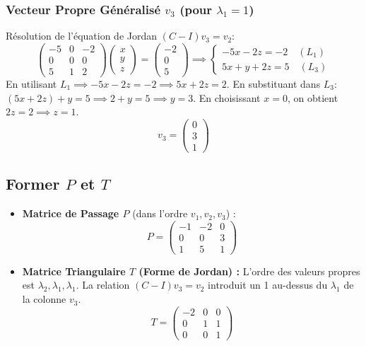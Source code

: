 \documentclass[french]{yLectureNote}
\begin{document}
\subsubsection{Vecteur Propre Généralisé $v_3$ (pour $\lambda_1 = 1$)}

Résolution de l'équation de Jordan $(C - I)v_3 = v_2$:
$$\begin{pmatrix} -5 & 0 & -2 \\ 0 & 0 & 0 \\ 5 & 1 & 2 \end{pmatrix} \begin{pmatrix} x \\ y \\ z \end{pmatrix} = \begin{pmatrix} -2 \\ 0 \\ 5 \end{pmatrix} \implies \begin{cases} -5x - 2z = -2 \quad (L_1) \\ 5x + y + 2z = 5 \quad (L_3) \end{cases}$$
En utilisant $L_1 \implies -5x - 2z = -2 \implies 5x + 2z = 2$.
En substituant dans $L_3$: $(5x + 2z) + y = 5 \implies 2 + y = 5 \implies y = 3$.
En choisissant $x=0$, on obtient $2z=2 \implies z=1$.
$$v_3 = \begin{pmatrix} 0 \\ 3 \\ 1 \end{pmatrix}$$
\subsection{Former $P$ et $T$}

\begin{itemize}
    \item \textbf{Matrice de Passage $P$} (dans l'ordre $v_1, v_2, v_3$) :
    $$P = \begin{pmatrix} -1 & -2 & 0 \\ 0 & 0 & 3 \\ 1 & 5 & 1 \end{pmatrix}$$

    \item \textbf{Matrice Triangulaire $T$ (Forme de Jordan) :}
    L'ordre des valeurs propres est $\lambda_2, \lambda_1, \lambda_1$. La relation $(C - I)v_3 = v_2$ introduit un 1 au-dessus du $\lambda_1$ de la colonne $v_3$.
    $$T = \begin{pmatrix} -2 & 0 & 0 \\ 0 & 1 & 1 \\ 0 & 0 & 1 \end{pmatrix}$$
\end{itemize}
\end{document}
